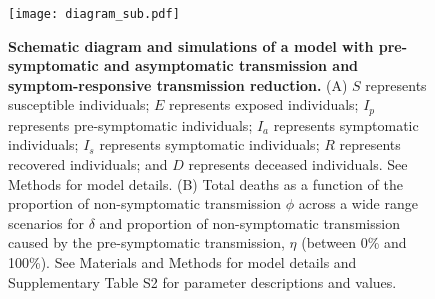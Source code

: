 \documentclass[12pt]{article}
\begin{document}
\begin{figure}[!ht]
\begin{center}
\texttt{[image: diagram\_sub.pdf]}
\caption{
\textbf{Schematic diagram and simulations of a model with pre-symptomatic and asymptomatic transmission and symptom-responsive transmission reduction.}
(A) $S$ represents susceptible individuals; $E$ represents exposed individuals; $I_p$ represents pre-symptomatic individuals; $I_a$ represents symptomatic individuals; $I_s$ represents symptomatic individuals; $R$ represents recovered individuals; and $D$ represents deceased individuals. See Methods for model details.
(B) Total deaths as a function of the proportion of non-symptomatic transmission $\phi$ across a wide range scenarios for $\delta$ and proportion of non-symptomatic transmission caused by the pre-symptomatic transmission, $\eta$ (between 0\% and 100\%). 
See Materials and Methods for model details and Supplementary Table S2 for parameter descriptions and values.
}
\end{center}
\end{figure}

\pagebreak


\end{document}
